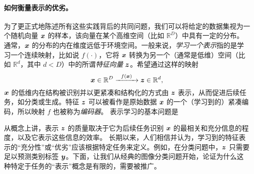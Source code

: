 \documentclass[../../book-main_zh.tex]{subfiles}
\begin{document}
\paragraph{如何衡量表示的优劣。}
为了更正式地陈述所有这些实践背后的共同问题，我们可以将给定的数据集视为一个随机向量 $\bm{x}$ 的样本，该向量在某个高维空间（比如 $\mathbb{R}^D$）中具有一定的分布。通常，$\bm{x}$ 的分布的内在维度远低于环境空间。一般来说，{\em 学习一个表示}指的是学习一个连续映射，比如说 $f(\cdot)$，它将 $\bm{x}$ 转换为另一个（通常是低维）空间（比如 $\mathbb{R}^d$，其中 $d < D$）中的所谓{\em 特征向量} $\bm{z}$。希望通过这样的映射
\begin{equation}
	\bm{x} \in \mathbb{R}^D \xrightarrow{\hspace{2mm} f(\bm{x})\hspace{2mm}} \bm{z}  \in \mathbb{R}^d,
	\label{eqn:chap4-1-encoding}
\end{equation}
$\bm{x}$ 的低维内在结构被识别并以更紧凑和结构化的方式由 $\bm{z}$ 表示，从而促进后续任务，如分类或生成。特征 $\bm{z}$ 可以被看作是原始数据 $\bm{x}$ 的一个（学习到的）紧凑编码，所以映射 $f$ 也被称为\textit{编码器}。
表示学习的基本问题是
\begin{center}
\end{center}

从概念上讲，表示 $\bm{z}$ 的质量取决于它为后续任务识别 $\bm{x}$ 的最相关和充分信息的程度，以及它表示这些信息的效率。
长期以来，人们相信并认为，学习到的特征表示的“充分性”或“优劣”应该根据特定任务来定义。例如，在分类问题中，$\bm{z}$ 只需要足以预测类别标签 $\bm{y}$。下面，让我们从经典的图像分类问题开始，论证为什么这种特定于任务的“表示”概念是有限的，需要被推广。

\end{document}

